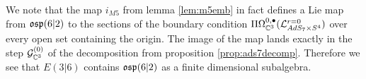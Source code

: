 \begin{rmk}
We note that the map $i_{M5}$ from lemma \ref{lem:m5emb} in fact defines a Lie map from $\mathfrak{osp}(6|2)$ to the sections of the boundary condition $\Pi \Omega^{0,\bullet}_{\mathbb{C}^3} (\mathcal{L}^{r=0}_{AdS_7\times S^4} )$ over every open set containing the origin. The image of the map lands exactly in the step $\mathcal{G}^{(0)}_{\mathbb{C}^3}$ of the decomposition from proposition \ref{prop:ads7decomp}. Therefore we see that $E(3|6)$ contains $\mathfrak{osp}(6|2)$ as a finite dimensional subalgebra.  
\end{rmk}



